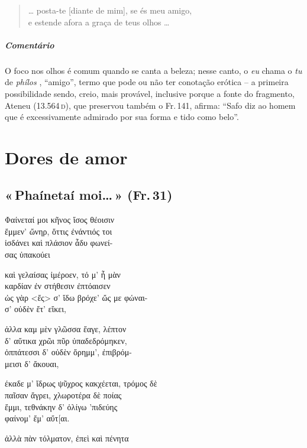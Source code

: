 \begin{verse}
\ldots{} posta-te [diante de mim], se és meu amigo,\\
e estende afora a graça de teus olhos \ldots{}
\end{verse}

\medskip

{\paragraph{Comentário} O foco nos olhos é comum quando se canta a beleza; nesse canto, o \textit{eu} chama o
\textit{tu} de \textit{phílos }, ``amigo'', termo que pode ou não ter conotação
erótica -- a primeira possibilidade sendo, creio, mais provável, inclusive
porque a fonte do fragmento, Ateneu (13.564\,\textsc{d}), que preservou também o Fr.\,141, afirma:
``Safo diz ao homem que é excessivamente admirado por sua forma e tido como belo''.}



\chapter{Dores de amor}

\section[«\,Phaínetaí moi\ldots{}\,» (Fr.\,31)]{«\,Phaínetaí moi\ldots{}\,» (Fr.\,31)}

\begin{gkverse}
Φαίνεταί μοι κῆνος ἴσος θέοισιν\\
ἔμμεν’ ὤνηρ, ὄττις ἐνάντιός τοι\\
ἰσδάνει καὶ πλάσιον ἆδυ φωνεί-\\
σας ὐπακούει

καὶ γελαίσας ἰμέροεν, τό μ’ ἦ μὰν\\
καρδίαν ἐν στήθεσιν ἐπτόαισεν\\
ὠς γὰρ <ἔς> σ’ ἴδω βρόχε’ ὤς με φώναι-\\
σ’ οὐδὲν ἔτ’ εἴκει,

ἀλλα \dagger{}καμ\dagger{} μὲν γλῶσσα \dagger{}ἔαγε\dagger{}, λέπτον\\
δ’ αὔτικα χρῶι πῦρ ὐπαδεδρόμηκεν,\\
ὀππάτεσσι δ’ οὐδὲν ὄρημμ’, ἐπιβρόμ-\\
μεισι δ’ ἄκουαι,

\dagger{}έκαδε\dagger{} μ’ ἴδρως ψῦχρος κακχέεται, τρόμος δὲ\\
παῖσαν ἄγρει, χλωροτέρα δὲ ποίας\\
ἔμμι, τεθνάκην δ’ ὀλίγω ’πιδεύης\\
φαίνομ’ ἔμ’ αὔτ[αι.

ἀλλὰ πὰν τόλματον, ἐπεὶ \dagger{}καὶ πένητα\dagger{}
\end{gkverse}

